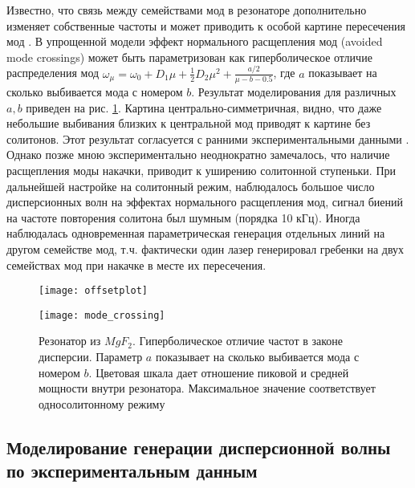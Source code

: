Известно, что связь между семействами мод в резонаторе дополнительно изменяет собственные частоты и может приводить к особой картине пересечения мод \cite{HerrPRL2014}. В упрощенной модели эффект нормального расщепления мод (avoided mode crossings) может быть параметризован как гиперболическое отличие распределения мод $\omega_\mu=\omega_0+D_1\mu+\frac{1}{2}D_2\mu^2+\frac{a/2}{\mu-b-0.5}$, где $a$ показывает на сколько выбивается мода с номером $b$. Результат моделирования для различных $a,b$ приведен на рис. \ref{offsetplot}. Картина центрально-симметричная, видно, что даже небольшие выбивания близких к центральной мод приводят к картине без солитонов. Этот результат согласуется с ранними экспериментальными данными \cite{HerrPRL2014}. Однако позже мною экспериментально неоднократно замечалось, что наличие расщепления моды накачки, приводит к уширению солитонной ступеньки. При дальнейшей настройке на солитонный режим, наблюдалось большое число дисперсионных волн на эффектах нормального расщепления мод, сигнал биений на частоте повторения солитона был шумным (порядка 10 кГц). Иногда наблюдалась одновременная параметрическая генерация отдельных линий на другом семействе мод, т.ч. фактически один лазер генерировал гребенки на двух семействах мод при накачке в месте их пересечения.

\begin{figure}
  \centering
  \texttt{[image: offsetplot]}

  \texttt{[image: mode\_crossing]}
  \caption{Резонатор из $MgF_2$. Гиперболическое отличие частот в законе дисперсии. Параметр $a$ показывает на сколько выбивается мода с номером $b$. Цветовая шкала дает отношение пиковой и средней мощности внутри резонатора. Максимальное значение соответствует односолитонному режиму} \label{offsetplot}
\end{figure}

\subsection{Моделирование генерации дисперсионной волны по экспериментальным данным}

